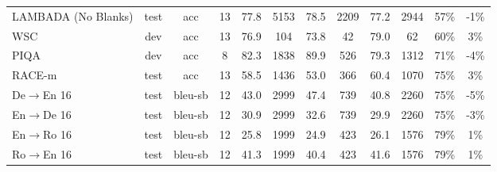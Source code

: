 \documentclass{article}
\begin{document}
\begin{table}
{\begin{adjustwidth}{-1.4in}{-1.4in}
\begin{center}
\begin{tabular}{lccccccccccc}
 LAMBADA (No Blanks) &  test &      acc &  13 &        77.8 &                      5153 &                            78.5 &                      2209 &                            77.2 &                      2944 &                            57\% &                                                -1\% \\
                 WSC &   dev &      acc &  13 &        76.9 &                       104 &                            73.8 &                        42 &                            79.0 &                        62 &                            60\% &                                                 3\% \\
                PIQA &   dev &      acc &   8 &        82.3 &                      1838 &                            89.9 &                       526 &                            79.3 &                      1312 &                            71\% &                                                -4\% \\
              RACE-m &  test &      acc &  13 &        58.5 &                      1436 &                            53.0 &                       366 &                            60.4 &                      1070 &                            75\% &                                                 3\% \\
        De$\to$En 16 &  test &  bleu-sb &  12 &        43.0 &                      2999 &                            47.4 &                       739 &                            40.8 &                      2260 &                            75\% &                                                -5\% \\
        En$\to$De 16 &  test &  bleu-sb &  12 &        30.9 &                      2999 &                            32.6 &                       739 &                            29.9 &                      2260 &                            75\% &                                                -3\% \\
        En$\to$Ro 16 &  test &  bleu-sb &  12 &        25.8 &                      1999 &                            24.9 &                       423 &                            26.1 &                      1576 &                            79\% &                                                 1\% \\
        Ro$\to$En 16 &  test &  bleu-sb &  12 &        41.3 &                      1999 &                            40.4 &                       423 &                            41.6 &                      1576 &                            79\% &                                                 1\% \\

\end{tabular}
\end{center}
\end{adjustwidth}}
\end{table}
\end{document}
